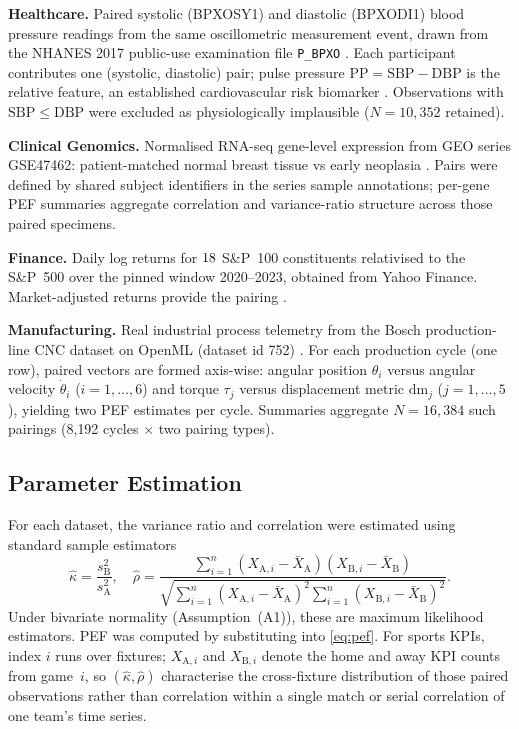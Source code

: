 \textbf{Healthcare.} Paired systolic ({BPXOSY1}) and diastolic ({BPXODI1}) blood pressure readings from the same oscillometric measurement event, drawn from the {NHANES} 2017 public-use examination file \texttt{P\_BPXO} \parencite{nhanes2017pbxo}. Each participant contributes one (systolic, diastolic) pair; pulse pressure $\mathrm{PP}=\mathrm{SBP}-\mathrm{DBP}$ is the relative feature, an established cardiovascular risk biomarker \parencite{franklin1999,blacher1999}. Observations with $\mathrm{SBP}\le\mathrm{DBP}$ were excluded as physiologically implausible ($N=10{,}352$ retained).

\textbf{Clinical Genomics.} Normalised {RNA}-seq gene-level expression from {GEO} series {GSE47462}: patient-matched normal breast tissue vs early neoplasia \parencite{geoGSE47462,brunner2014earlybreast}. Pairs were defined by shared subject identifiers in the series sample annotations; per-gene PEF summaries aggregate correlation and variance-ratio structure across those paired specimens.

\textbf{Finance.} Daily log returns for $18$ {S\&P}~100 constituents relativised to the {S\&P}~500 over the pinned window 2020--2023, obtained from Yahoo Finance. Market-adjusted returns provide the pairing \parencite{sharpe1966,sharpe1994,fama1970,carhart1997,fama1993}.

\textbf{Manufacturing.} Real industrial process telemetry from the {Bosch} production-line {CNC} dataset on {OpenML} (dataset id 752) \parencite{openml752bosch}. For each production cycle (one row), paired vectors are formed axis-wise: angular position $\theta_i$ versus angular velocity $\dot\theta_i$ ($i=1,\ldots,6$) and torque $\tau_j$ versus displacement metric $\mathrm{dm}_j$ ($j=1,\ldots,5$), yielding two PEF estimates per cycle. Summaries aggregate $N=16{,}384$ such pairings (8{,}192 cycles $\times$ two pairing types).

\subsection{Parameter Estimation}

For each dataset, the variance ratio and correlation were estimated using standard sample estimators
\begin{equation}
  \hat{\kappa} = \frac{s^{2}_{\mathrm{B}}}{s^{2}_{\mathrm{A}}},
  \quad
  \hat{\rho} =
  \frac{\sum_{i=1}^{n}(X_{\mathrm{A},i}-\bar{X}_{\mathrm{A}})(X_{\mathrm{B},i}-\bar{X}_{\mathrm{B}})}
       {\sqrt{\sum_{i=1}^{n}(X_{\mathrm{A},i}-\bar{X}_{\mathrm{A}})^{2}
              \sum_{i=1}^{n}(X_{\mathrm{B},i}-\bar{X}_{\mathrm{B}})^{2}}}.
\end{equation}
Under bivariate normality (Assumption~(A1)), these are maximum likelihood estimators. PEF was computed by substituting into \cref{eq:pef}. For sports KPIs, index $i$ runs over fixtures; $X_{\mathrm{A},i}$ and $X_{\mathrm{B},i}$ denote the home and away KPI counts from game~$i$, so $(\hat\kappa,\hat\rho)$ characterise the cross-fixture distribution of those paired observations rather than correlation within a single match or serial correlation of one team's time series.

